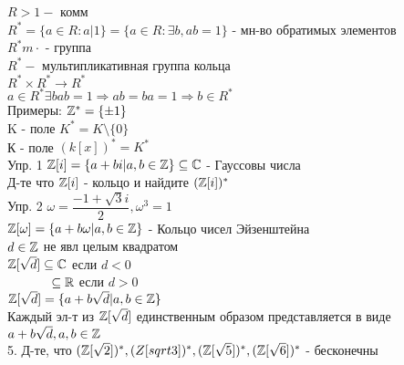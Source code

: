$ R > 1 - $ комм \\
$ R^* = \{ a \in R : a | 1 \} = \{ a \in R : \exists b, ab=1 \} $ - мн-во обратимых элементов \\
$ R^*m \cdot $ - группа \\
$ R^* - $ мультипликативная группа кольца \\
$ R^* \times R^* \rightarrow R^* $\\
$ a \in R^* \exists b ab=1 \Rightarrow ab = ba = 1 \Rightarrow b \in R^* $\\
Примеры: $ \mathbb{Z}^* = \{\pm 1\} $ \\
K - поле $ K^* = K \setminus \{0\} $\\
К - поле $ (k[x])^* = K^* $ \\
Упр. 1 $ \mathbb{Z}[i] = \{ a + bi | a,b \in \mathbb{Z} \} \subseteq \mathbb{C} $ - Гауссовы числа\\
Д-те что $ \mathbb{Z}[i] $ - кольцо и найдите $(\mathbb{Z}[i])^* $\\
Упр. 2 $ \omega = \dfrac{-1 + \sqrt{3} i}{2}, \omega^3 = 1 $ \\
$ \mathbb{Z}[\omega] = \{ a + b\omega | a,b \in \mathbb{Z} \} $ - Кольцо чисел Эйзенштейна \\
$ d \in \mathbb{Z} $ не явл целым квадратом \\
$ \mathbb{Z}[\sqrt{d}] \subseteq \mathbb{C} $ если $ d < 0 $ \\
$ \hspace*{12mm} \subseteq \R $ если $ d > 0 $ \\
$ \mathbb{Z}[\sqrt{d}] = \{ a + b\sqrt{d} | a, b \in \mathbb{Z}  \} $ \\
Каждый эл-т из $ \mathbb{Z}[\sqrt{d}] $ единственным образом представляется в виде $ a + b\sqrt{d}, a,b \in \mathbb{Z} $ \\
5. Д-те, что $ (\mathbb{Z}[\sqrt{2}])^*, (Z[sqrt{3}])^*, (\mathbb{Z}[\sqrt{5}])^*, (\mathbb{Z}[\sqrt{6}])^* $ - бесконечны \\ %


